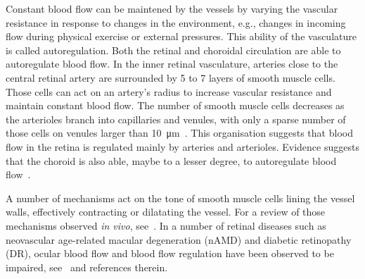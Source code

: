 \documentclass[12pt,a4paper]{journal}
\begin{document}
Constant blood flow can be maintened by the vessels by varying the vascular resistance in response to changes in the environment, e.g., changes in incoming flow during physical exercise or external pressures.
This ability of the vasculature is called autoregulation.
Both the retinal and choroidal circulation are able to autoregulate blood flow.
In the inner retinal vasculature, arteries close to the central retinal artery are surrounded by 5 to 7 layers of smooth muscle cells.
Those cells can act on an artery's radius to increase vascular resistance and maintain constant blood flow.
The number of smooth muscle cells decreases as the arterioles branch into capillaries and venules, with only a sparse number of those cells on venules larger than \SI{10}{\micro\meter}~\cite{An2020, Kur_2012}.
This organisation suggests that blood flow in the retina is regulated mainly by arteries and arterioles.
Evidence suggests that the choroid is also able, maybe to a lesser degree, to autoregulate blood flow~\cite{CERiva1997, Polska2007}.

A number of mechanisms act on the tone of smooth muscle cells lining the vessel walls, effectively contracting or dilatating the vessel.
For a review of those mechanisms observed \textit{in vivo}, see~\cite{Kur_2012}.
In a number of retinal diseases such as neovascular age-related macular degeneration (nAMD) and diabetic retinopathy (DR), ocular blood flow and blood flow regulation have been observed to be impaired, see~\cite{Kur_2012} and references therein.
\end{document}
